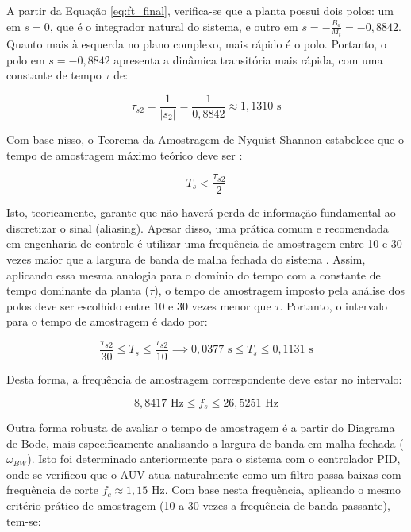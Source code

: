 \documentclass[12pt, a4paper]{article}
\newcommand{\vehicleMass}{M_t}
\begin{document}
			A partir da Equação \ref{eq:ft_final}, verifica-se que a planta possui dois polos: um em $s=0$, que é o integrador natural do sistema, e outro em $s=-\frac{B_d}{\vehicleMass} = -0{,}8842$. Quanto mais à esquerda no plano complexo, mais rápido é o polo. Portanto, o polo em $s=-0{,}8842$ apresenta a dinâmica transitória mais rápida, com uma constante de tempo $\tau$ de:

			\begin{equation}
				\tau_{s2} = \frac{1}{|s_2|} = \frac{1}{0{,}8842} \approx 1{,}1310 \text{ s}
				\label{eq:constante_de_tempo_s2}
			\end{equation}

			Com base nisso, o Teorema da Amostragem de Nyquist-Shannon estabelece que o tempo de amostragem máximo teórico deve ser \cite{franklin}:

			\begin{equation}
				T_s < \frac{\tau_{s2}}{2}
			\end{equation}

			Isto, teoricamente, garante que não haverá perda de informação fundamental ao discretizar o sinal (aliasing). Apesar disso, uma prática comum e recomendada em engenharia de controle é utilizar uma frequência de amostragem entre 10 e 30 vezes maior que a largura de banda de malha fechada do sistema \cite{astrom}. Assim, aplicando essa mesma analogia para o domínio do tempo com a constante de tempo dominante da planta ($\tau$), o tempo de amostragem imposto pela análise dos polos deve ser escolhido entre 10 e 30 vezes menor que $\tau$. Portanto, o intervalo para o tempo de amostragem é dado por:

			\begin{equation}
				\frac{\tau_{s2}}{30} \le T_s \le \frac{\tau_{s2}}{10} \implies 0{,}0377 \text{ s} \le T_s \le 0{,}1131 \text{ s}
			\end{equation}

			Desta forma, a frequência de amostragem correspondente deve estar no intervalo:

			\begin{equation}
				8{,}8417 \text{ Hz} \le f_s \le 26{,}5251 \text{ Hz}
			\end{equation}

			Outra forma robusta de avaliar o tempo de amostragem é a partir do Diagrama de Bode, mais especificamente analisando a largura de banda em malha fechada ($\omega_{BW}$). Isto foi determinado anteriormente para o sistema com o controlador PID, onde se verificou que o AUV atua naturalmente como um filtro passa-baixas com frequência de corte $f_c \approx 1{,}15$ Hz. Com base nesta frequência, aplicando o mesmo critério prático de amostragem (10 a 30 vezes a frequência de banda passante), tem-se:
\end{document}

